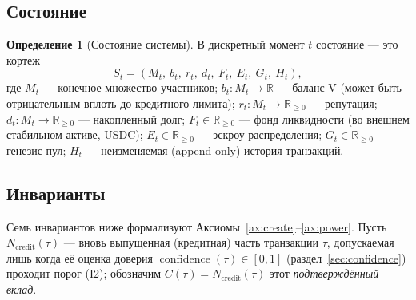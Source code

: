 \documentclass[11pt]{article}
\theoremstyle{plain}
\theoremstyle{definition}
\newtheorem{definition}{Определение}
\theoremstyle{remark}
\newcommand{\V}{\mathrm{V}}
\newcommand{\confidence}{\operatorname{confidence}}
\begin{document}
\subsection{Состояние}

\begin{definition}[Состояние системы]
В дискретный момент $t$ состояние --- это кортеж
\[
S_t = (M_t,\ b_t,\ r_t,\ d_t,\ F_t,\ E_t,\ G_t,\ H_t),
\]
где $M_t$ --- конечное множество участников; $b_t: M_t \to \mathbb{R}$ --- баланс $\V$ (может быть отрицательным вплоть до кредитного лимита); $r_t: M_t \to \mathbb{R}_{\ge 0}$ --- репутация; $d_t: M_t \to \mathbb{R}_{\ge 0}$ --- накопленный долг; $F_t \in \mathbb{R}_{\ge 0}$ --- фонд ликвидности (во внешнем стабильном активе, USDC); $E_t \in \mathbb{R}_{\ge 0}$ --- эскроу распределения; $G_t \in \mathbb{R}_{\ge 0}$ --- генезис-пул; $H_t$ --- неизменяемая (append-only) история транзакций.
\end{definition}

\subsection{Инварианты}\label{sec:invariants}

Семь инвариантов ниже формализуют Аксиомы~\ref{ax:create}--\ref{ax:power}. Пусть $N_{\mathrm{credit}}(\tau)$ --- вновь выпущенная (кредитная) часть транзакции $\tau$, допускаемая лишь когда её оценка доверия $\confidence(\tau)\in[0,1]$ (раздел~\ref{sec:confidence}) проходит порог (I2); обозначим $C(\tau)=N_{\mathrm{credit}}(\tau)$ этот \emph{подтверждённый вклад}.
\end{document}
